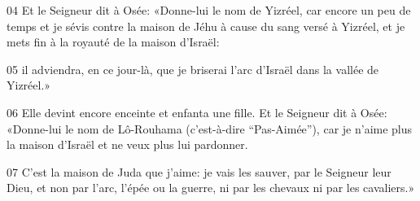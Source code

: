 
04 Et le Seigneur dit à Osée: «Donne-lui le nom de Yizréel, car encore un peu de temps et je sévis contre la maison de Jéhu à cause du sang versé à Yizréel, et je mets fin à la royauté de la maison d’Israël:

05 il adviendra, en ce jour-là, que je briserai l’arc d’Israël dans la vallée de Yizréel.»

06 Elle devint encore enceinte et enfanta une fille. Et le Seigneur dit à Osée: «Donne-lui le nom de Lô-Rouhama (c’est-à-dire “Pas-Aimée”), car je n’aime plus la maison d’Israël et ne veux plus lui pardonner.

07 C’est la maison de Juda que j’aime: je vais les sauver, par le Seigneur leur Dieu, et non par l’arc, l’épée ou la guerre, ni par les chevaux ni par les cavaliers.»
